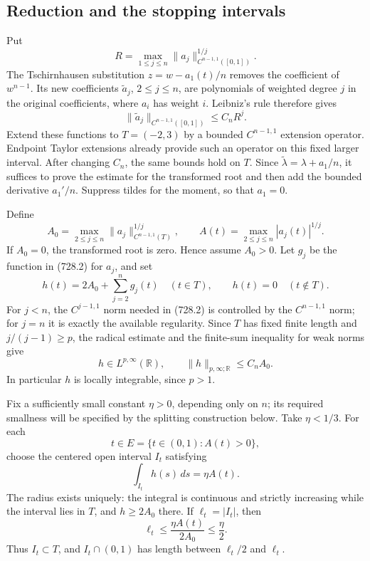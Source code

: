 \documentclass[11pt,a4paper]{article}
\theoremstyle{remark}
\begin{document}
\subsection{Reduction and the stopping intervals}

Put
\[
 R=\max_{1\le j\le n}\|a_j\|_{C^{n-1,1}([0,1])}^{1/j}.
\]
The Tschirnhausen substitution $z=w-a_1(t)/n$ removes the coefficient of
$w^{n-1}$.  Its new coefficients $\widetilde a_j$, $2\le j\le n$, are
polynomials of weighted degree $j$ in the original coefficients, where
$a_i$ has weight $i$.  Leibniz's rule therefore gives
\[
 \|\widetilde a_j\|_{C^{n-1,1}([0,1])}\le C_nR^j.
\]
Extend these functions to $T=(-2,3)$ by a bounded $C^{n-1,1}$ extension
operator.  Endpoint Taylor extensions already provide such an operator on
this fixed larger interval.  After changing $C_n$, the same bounds hold
on $T$.  Since $\widetilde\lambda=\lambda+a_1/n$, it suffices to prove the
estimate for the transformed root and then add the bounded derivative
$a_1'/n$.  Suppress tildes for the moment, so that $a_1=0$.

Define
\[
 A_0=\max_{2\le j\le n}\|a_j\|_{C^{n-1,1}(T)}^{1/j},
 \qquad A(t)=\max_{2\le j\le n}|a_j(t)|^{1/j}.
\]
If $A_0=0$, the transformed root is zero.  Hence assume $A_0>0$.  Let $g_j$
be the function in (728.2) for $a_j$, and set
\[
 h(t)=2A_0+\sum_{j=2}^n g_j(t)\quad(t\in T),
 \qquad h(t)=0\quad(t\notin T).
 \tag{728.4}
\]
For $j<n$, the $C^{j-1,1}$ norm needed in (728.2) is controlled by the
$C^{n-1,1}$ norm; for $j=n$ it is exactly the available regularity.
Since $T$ has fixed finite length and $j/(j-1)\ge p$, the radical estimate
and the finite-sum inequality for weak norms give
\[
 h\in L^{p,\infty}(\mathbb R),\qquad
 \|h\|_{p,\infty;\mathbb R}\le C_nA_0.
 \tag{728.5}
\]
In particular $h$ is locally integrable, since $p>1$.

Fix a sufficiently small constant $\eta>0$, depending only on $n$; its
required smallness will be specified by the splitting construction below.
Take $\eta<1/3$.  For each
\[
 t\in E=\{t\in(0,1):A(t)>0\},
\]
choose the centered open interval $I_t$ satisfying
\[
 \int_{I_t}h(s)\,ds=\eta A(t).
 \tag{728.6}
\]
The radius exists uniquely: the integral is continuous and strictly
increasing while the interval lies in $T$, and $h\ge2A_0$ there.  If
$\ell_t=|I_t|$, then
\[
 \ell_t\le\frac{\eta A(t)}{2A_0}\le\frac\eta2.
 \tag{728.7}
\]
Thus $I_t\subset T$, and $I_t\cap(0,1)$ has length between $\ell_t/2$
and $\ell_t$.
\end{document}
